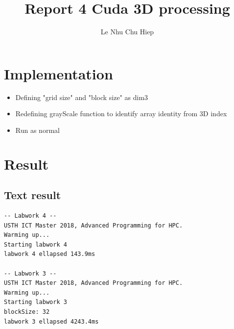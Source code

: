 \documentclass{article}
\title{Report 4 Cuda 3D processing}
\author{Le Nhu Chu Hiep}
\begin{document}
\maketitle

\section{Implementation}
\begin{itemize}
    \item Defining "grid size" and "block size" as dim3
    \item Redefining grayScale function to identify array identity from 3D index
    \item Run as normal
\end{itemize}

\section{Result}
\subsection{Text result}
\begin{verbatim}
-- Labwork 4 --
USTH ICT Master 2018, Advanced Programming for HPC.
Warming up...
Starting labwork 4
labwork 4 ellapsed 143.9ms

-- Labwork 3 --
USTH ICT Master 2018, Advanced Programming for HPC.
Warming up...
Starting labwork 3
blockSize: 32
labwork 3 ellapsed 4243.4ms
\end{verbatim}
\end{document}
